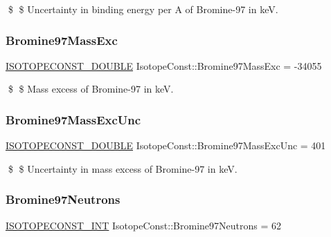 \$ \$ Uncertainty in binding energy per A of Bromine-\/97 in keV. \mbox{\label{group___isotope_const-_bromine-_br97_ga405ee8fab28bd677e2d9c79c1b1bfa1a}} 
\subsubsection{\texorpdfstring{Bromine97\+Mass\+Exc}{Bromine97MassExc}}
{\footnotesize\ttfamily \mbox{\hyperlink{group___isotope_const-_macros_ga8f45a7272ce02c0b4c65c44636ed719a}{I\+S\+O\+T\+O\+P\+E\+C\+O\+N\+S\+T\+\_\+\+D\+O\+U\+B\+LE}} Isotope\+Const\+::\+Bromine97\+Mass\+Exc = -\/34055}

\$ \$ Mass excess of Bromine-\/97 in keV. \mbox{\label{group___isotope_const-_bromine-_br97_gae0798852ac4cda65526deef8426605a4}} 
\subsubsection{\texorpdfstring{Bromine97\+Mass\+Exc\+Unc}{Bromine97MassExcUnc}}
{\footnotesize\ttfamily \mbox{\hyperlink{group___isotope_const-_macros_ga8f45a7272ce02c0b4c65c44636ed719a}{I\+S\+O\+T\+O\+P\+E\+C\+O\+N\+S\+T\+\_\+\+D\+O\+U\+B\+LE}} Isotope\+Const\+::\+Bromine97\+Mass\+Exc\+Unc = 401}

\$ \$ Uncertainty in mass excess of Bromine-\/97 in keV. \mbox{\label{group___isotope_const-_bromine-_br97_ga8d974f27ddbcbc1719a4680f448e9ecb}} 
\subsubsection{\texorpdfstring{Bromine97\+Neutrons}{Bromine97Neutrons}}
{\footnotesize\ttfamily \mbox{\hyperlink{group___isotope_const-_macros_ga5f18360b3e99483a35c32d789e62621c}{I\+S\+O\+T\+O\+P\+E\+C\+O\+N\+S\+T\+\_\+\+I\+NT}} Isotope\+Const\+::\+Bromine97\+Neutrons = 62}

